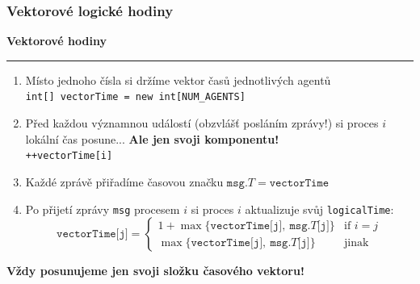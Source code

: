 \documentclass[usenames,dvipsnames,9pt]{beamer}
\begin{document}
\begin{frame}
  \frametitle{Vektorové logické hodiny}

  \begin{center}
    \LARGE \bf Vektorové hodiny
  \end{center}

  \vspace{1em}\hrule\vspace{1em}

  \begin{enumerate}
    \pause\item Místo jednoho čísla si držíme vektor časů jednotlivých agentů \\
  	            \texttt{int[] vectorTime = new int[NUM_AGENTS]}
  	\pause\item Před každou významnou událostí (obzvlášť posláním zprávy!) si proces $i$ lokální čas posune... \textbf{Ale jen svoji komponentu!} \\
  				\texttt{++vectorTime[i]}
  	\pause\item Každé zprávě přiřadíme časovou značku $\texttt{msg.}T = \texttt{vectorTime}$
  	\pause\item Po přijetí zprávy \texttt{msg} procesem $i$ si proces $i$ aktualizuje svůj \texttt{logicalTime}:
  				\[ \texttt{vectorTime[j]} = \begin{cases}
  				      1 + \max \lbrace \texttt{vectorTime[j]},\ \texttt{msg.}T\texttt{[j]} \rbrace & \text{if } i = j \\
  				      \max \lbrace \texttt{vectorTime[j]},\ \texttt{msg.}T\texttt{[j]} \rbrace & \text{jinak}
  				   \end{cases}
  				\]
  \end{enumerate}

  \pause
  \begin{center}
  	\bf \faWarning \hspace{3pt} Vždy posunujeme jen svoji složku časového vektoru!
  \end{center}




\end{frame}
\end{document}

